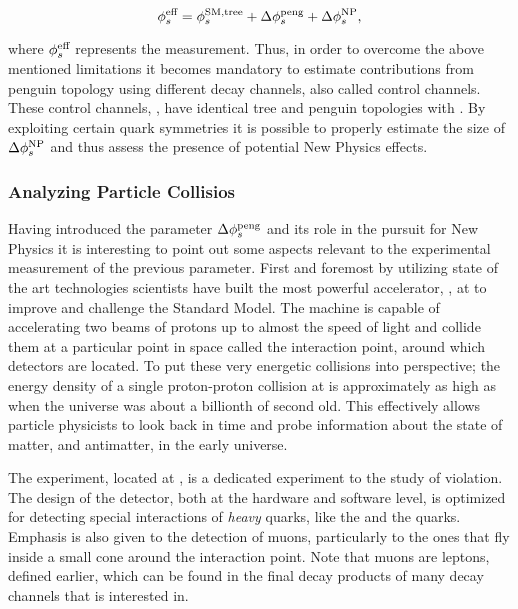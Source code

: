 \begin{equation}
\centering
 \phis^{\text {eff}} = \phis^{\tiny \text{SM,tree}} + \Delta\phiS{peng} + \Delta\phis^{\tiny \text{NP}},
 \label{app_phis_sm_peng}
\end{equation}

\noindent where $\phi_{s}^{\text {eff}}$ represents the \phis measurement.
Thus, in order to overcome the above mentioned limitations it becomes mandatory to estimate
contributions from penguin topology using different decay channels, also called control channels.
These control channels, \eg \BsJpsiKst, have identical tree and penguin topologies with \BsJpsiPhi.
By exploiting certain quark symmetries it is possible to properly estimate the size of
$\Delta\phi_{s}^{\tiny \text{NP}}$ and thus assess the presence of potential New Physics effects.

\subsubsection{Analyzing Particle Collisios}

Having introduced the parameter $\Delta\phi_{s}^{\tiny\text{peng}}$ and its role in the pursuit for New Physics
it is interesting to point out some aspects relevant to the experimental measurement of the previous parameter.
First and foremost by utilizing state of the art technologies scientists have built the most
powerful accelerator, \lhc, at \cern to improve and challenge the Standard Model. The machine is
capable of accelerating two beams of protons up to almost the speed of light and collide them at
a particular point in space called the interaction point, around which detectors are located.
To put these very energetic collisions into perspective; the energy density of a single proton-proton
collision at \lhc is approximately as high as when the universe was about a billionth of second old.
This effectively allows particle physicists to look back in time and probe information about the
state of matter, and antimatter, in the early universe.

The \lhcb experiment, located at \cern, is a dedicated experiment to the study of \CP violation.
The design of the detector, both at the hardware and software level, is optimized for detecting
special interactions of {\it heavy} quarks, like the \bquark and the \cquark quarks.
Emphasis is also given to the detection of muons, particularly to the ones that fly
inside a small cone around the interaction point. Note that muons are leptons, defined earlier,
which can be found in the final decay products of many decay channels that \lhcb is interested in.

